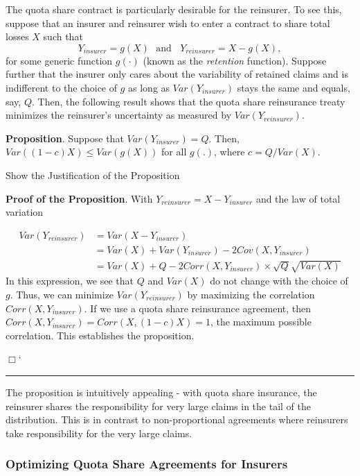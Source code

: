 \documentclass[]{book}
\theoremstyle{definition}
\theoremstyle{definition}
\theoremstyle{definition}
\theoremstyle{remark}
\begin{document}
The quota share contract is particularly desirable for the reinsurer. To
see this, suppose that an insurer and reinsurer wish to enter a contract
to share total losses \(X\) such that
\[Y_{insurer}=g(X) \ \ \ \text{and} \ \ \ \ Y_{reinsurer}=X-g(X),\] for
some generic function \(g(\cdot)\) (known as the \emph{retention}
function). Suppose further that the insurer only cares about the
variability of retained claims and is indifferent to the choice of \(g\)
as long as \(Var(Y_{insurer})\) stays the same and equals, say, \(Q\).
Then, the following result shows that the quota share reinsurance treaty
minimizes the reinsurer's uncertainty as measured by
\(Var(Y_{reinsurer})\).

\textbf{Proposition}. Suppose that \(Var(Y_{insurer})=Q.\) Then,
\(Var ((1-c)X) \le Var(g(X))\) for all \(g(.)\), where \(c=Q/Var(X)\).

Show the Justification of the Proposition

\hypertarget{toggleProof}{}
\textbf{Proof of the Proposition}. With
\(Y_{reinsurer} = X - Y_{insurer}\) and the law of total variation

\[
\begin{array}{ll}
Var (Y_{reinsurer}) &= Var (X-Y_{insurer}) \\
&= Var (X) + Var (Y_{insurer})  - 2 Cov (X,Y_{insurer}) \\
&=Var (X) + Q - 2 Corr (X,Y_{insurer}) \times \sqrt{Q} \sqrt{Var (X)}
\end{array}
\] In this expression, we see that \(Q\) and \(Var(X)\) do not change
with the choice of \(g\). Thus, we can minimize \(Var (Y_{reinsurer})\)
by maximizing the correlation \(Corr (X,Y_{insurer})\). If we use a
quota share reinsurance agreement, then
\(Corr (X,Y_{insurer})=Corr (X,(1-c)X)=1\), the maximum possible
correlation. This establishes the proposition.

\(\Box\)`

\begin{center}\rule{0.5\linewidth}{\linethickness}\end{center}

The proposition is intuitively appealing - with quota share insurance,
the reinsurer shares the responsibility for very large claims in the
tail of the distribution. This is in contrast to non-proportional
agreements where reinsurers take responsibility for the very large
claims.

\subsubsection{Optimizing Quota Share Agreements for
Insurers}\label{optimizing-quota-share-agreements-for-insurers}
\end{document}
